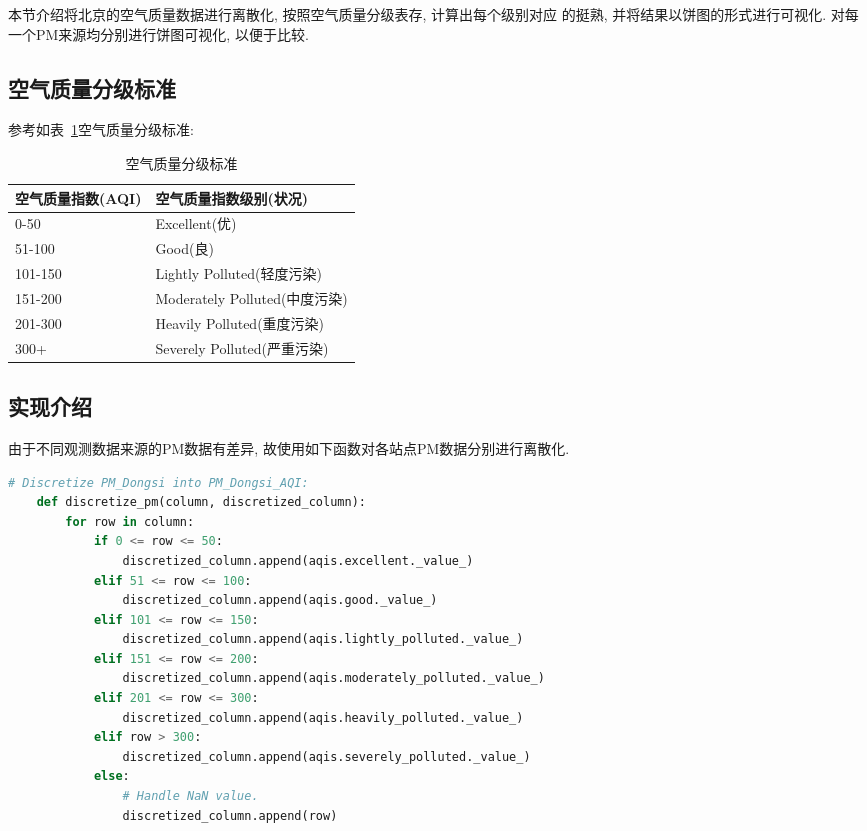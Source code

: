 本节介绍将北京的空气质量数据进行离散化, 按照空气质量分级表存, 计算出每个级别对应
的挺熟, 并将结果以饼图的形式进行可视化. 对每一个PM来源均分别进行饼图可视化, 以便于比较.

\subsection{空气质量分级标准}
参考如表~\ref{tab:空气质量分级标准}空气质量分级标准:
\begin{table}[ht!]
    \centering
    \begin{tabular}{|l|l|}
        \hline
        空气质量指数(AQI) & 空气质量指数级别(状况)              \\
        \hline
        \hline
        0-50        & Excellent(优)              \\
        51-100      & Good(良)                   \\
        101-150     & Lightly Polluted(轻度污染)    \\
        151-200     & Moderately Polluted(中度污染) \\
        201-300     & Heavily Polluted(重度污染)    \\
        300+        & Severely Polluted(严重污染)   \\
        \hline
    \end{tabular}
    \caption{空气质量分级标准}
    \label{tab:空气质量分级标准}
\end{table}

\subsection{实现介绍}
由于不同观测数据来源的PM数据有差异, 故使用如下函数对各站点PM数据分别进行离散化.
\begin{lstlisting}[language=Python]
    # Discretize PM_Dongsi into PM_Dongsi_AQI:
    def discretize_pm(column, discretized_column):
        for row in column:
            if 0 <= row <= 50:
                discretized_column.append(aqis.excellent._value_)
            elif 51 <= row <= 100:
                discretized_column.append(aqis.good._value_)
            elif 101 <= row <= 150:
                discretized_column.append(aqis.lightly_polluted._value_)
            elif 151 <= row <= 200:
                discretized_column.append(aqis.moderately_polluted._value_)
            elif 201 <= row <= 300:
                discretized_column.append(aqis.heavily_polluted._value_)
            elif row > 300:
                discretized_column.append(aqis.severely_polluted._value_)
            else:
                # Handle NaN value.
                discretized_column.append(row)
\end{lstlisting}

